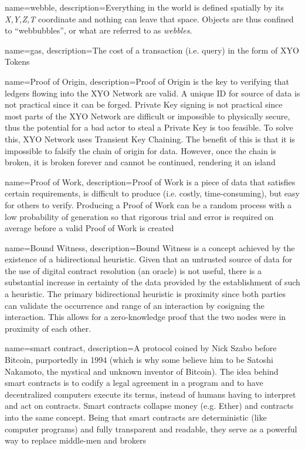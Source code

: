 \documentclass{article}
\begin{document}
{
    name={webble},
    description={Everything in the world is defined spatially by its \textit{X,Y,Z,T} coordinate and nothing can leave that space. Objects are thus confined to ``webbubbles'', or what are referred to as \textit{webbles}.}
}

{
    name={gas},
    description={The cost of a transaction (i.e. query) in the form of XYO Tokens}
}

{
    name={Proof of Origin},
    description={Proof of Origin is the key to verifying that ledgers flowing into the XYO Network are valid. A unique ID for source of data is not practical since it can be forged. Private Key signing is not practical since most parts of the XYO Network are difficult or impossible to physically secure, thus the potential for a bad actor to steal a Private Key is too feasible. To solve this, XYO Network uses Transient Key Chaining. The benefit of this is that it is impossible to falsify the chain of origin for data. However, once the chain is broken, it is broken forever and cannot be continued, rendering it an island}
}

{
    name={Proof of Work},
    description={Proof of Work is a piece of data that satisfies certain requirements, is difficult to produce (i.e. costly, time-consuming), but easy for others to verify. Producing a Proof of Work can be a random process with a low probability of generation so that rigorous trial and error is required on average before a valid Proof of Work is created}
}

{
    name={Bound Witness},
    description={Bound Witness is a concept achieved by the existence of a bidirectional heuristic. Given that an untrusted source of data for the use of digital contract resolution (an oracle) is not useful, there is a substantial increase in certainty of the data provided by the establishment of such a heuristic. The primary bidirectional heuristic is proximity since both parties can validate the occurrence and range of an interaction by cosigning the interaction. This allows for a zero-knowledge proof that the two nodes were in proximity of each other.}
}

{
    name={smart contract},
    description={A protocol coined by Nick Szabo before Bitcoin, purportedly in 1994 (which is why some believe him to be Satoshi Nakamoto, the mystical and unknown inventor of Bitcoin). The idea behind smart contracts is to codify a legal agreement in a program and to have decentralized computers execute its terms, instead of humans having to interpret and act on contracts. Smart contracts collapse money (e.g. Ether) and contracts into the same concept. Being that smart contracts are deterministic (like computer programs) and fully transparent and readable, they serve as a powerful way to replace middle-men and brokers}
}
\end{document}
